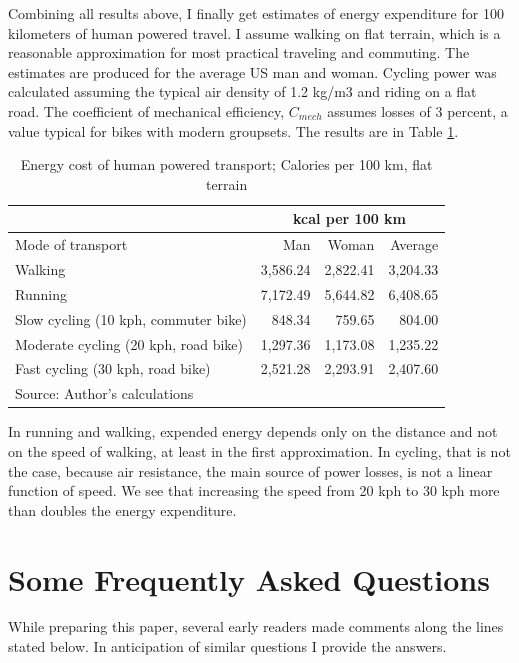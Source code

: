 \documentclass{article}[12pt,letterpaper]
\begin{document}
Combining all results above, I finally get estimates of energy expenditure for 100 kilometers of human powered travel. I assume walking on flat terrain, which is a reasonable approximation for most practical traveling and commuting. The estimates are produced for the average US man and woman. Cycling power was calculated assuming the typical air density of 1.2 kg/m3 and riding on a flat road. The coefficient of mechanical efficiency, $C_{mech}$ assumes losses of 3 percent, a value typical for bikes with modern groupsets.
The results are in Table \ref{tab:table_METs_walk_run_full}.
\begin{table}[ht]
  \begin{center}
    \caption{Energy cost of human powered transport; Calories per 100 km, flat terrain}
    \label{tab:table_METs_walk_run_full}
    \begin{tabular}{|l|r|r|r|}
      \hline
      &	\multicolumn{3}{|c|}{kcal per 100 km} \\
      \hline
      Mode of transport	&	Man	&	Woman	&	Average	\\
      \hline
      Walking 	&	3,586.24	&	2,822.41	&	3,204.33	\\
      Running 	&	7,172.49	&	5,644.82	&	6,408.65	\\
      Slow cycling (10 kph, commuter bike)	&	848.34	&	759.65	&	804.00	\\
      Moderate cycling  (20 kph, road bike)	&	1,297.36	&	1,173.08	&	1,235.22	\\
      Fast cycling  (30 kph, road bike)	&	2,521.28	&	2,293.91	&	2,407.60	\\
      \hline
      \multicolumn{4}{l}{Source: Author's calculations}      
    \end{tabular}
  \end{center}
\end{table}
In running and walking, expended energy depends only on the distance and not on the speed of walking, at least in the first approximation. In cycling, that is not the case, because air resistance, the main source of power losses, is not a linear function of speed. We see that increasing the speed from 20 kph to 30 kph more than doubles the energy expenditure.
\section{Some Frequently Asked Questions}
While preparing this paper, several early readers made comments along the lines stated below. In anticipation of similar questions I provide the answers.
\end{document}
